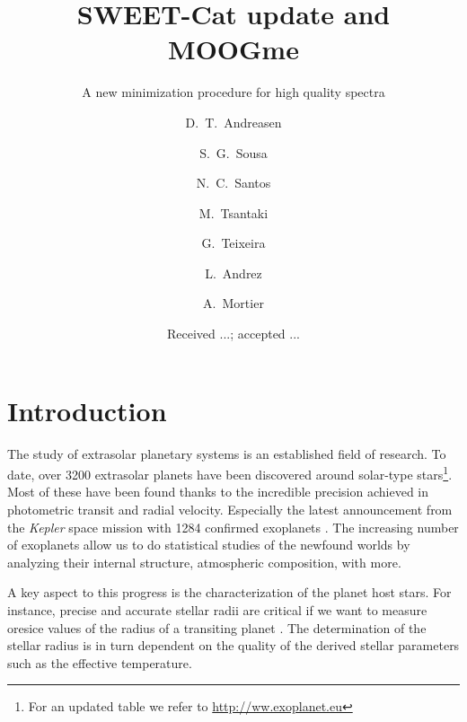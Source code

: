 \documentclass{aa}
\begin{document}
\title{SWEET-Cat update and MOOGme}
\subtitle{A new minimization procedure for high quality spectra}


\author{ D.~T.~Andreasen
    \and S.~G.~Sousa
    \and N.~C.~Santos
    \and M.~Tsantaki
    \and G.~Teixeira
    \and L.~Andrez
    \and A.~Mortier
}







\date{Received ...; accepted ...}

\abstract
{}
{}
{}
{}
{}



\maketitle



\section{Introduction}
\label{sec:introduction}
The study of extrasolar planetary systems is an established field of research.
To date, over 3200 extrasolar planets have been discovered around solar-type
stars\footnote{For an updated table we refer to \url{http://ww.exoplanet.eu}}.
Most of these have been found thanks to the incredible precision achieved in
photometric transit and radial velocity. Especially the latest announcement
from the \emph{Kepler} space mission with 1284 confirmed exoplanets
\citep{Morton2016}. The increasing number of exoplanets allow us to do
statistical studies of the newfound worlds by analyzing their internal
structure, atmospheric composition, with more.

A key aspect to this progress is the characterization of the planet host stars.
For instance, precise and accurate stellar radii are critical if we want to
measure oresice values of the radius of a transiting planet
\citep[see e.g.][]{Torres2012}. The determination of the stellar radius
is in turn dependent on the quality of the derived stellar parameters such as
the effective temperature.
\end{document}
